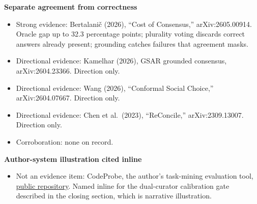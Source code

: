 \textbf{Separate agreement from correctness}

\begin{itemize}
\tightlist
\item
  Strong evidence: Bertalani\v{c} (2026), ``Cost of Consensus,'' arXiv:2605.00914. Oracle gap up to 32.3 percentage points; plurality voting discards correct answers already present; grounding catches failures that agreement masks.
\item
  Directional evidence: Kamelhar (2026), GSAR grounded consensus, arXiv:2604.23366. Direction only.
\item
  Directional evidence: Wang (2026), ``Conformal Social Choice,'' arXiv:2604.07667. Direction only.
\item
  Directional evidence: Chen et al.~(2023), ``ReConcile,'' arXiv:2309.13007. Direction only.
\item
  Corroboration: none on record.
\end{itemize}

\textbf{Author-system illustration cited inline}

\begin{itemize}
\tightlist
\item
  Not an evidence item: CodeProbe, the author's task-mining evaluation tool, \href{https://github.com/sjarmak/codeprobe}{public repository}. Named inline for the dual-curator calibration gate described in the closing section, which is narrative illustration.
\end{itemize}
